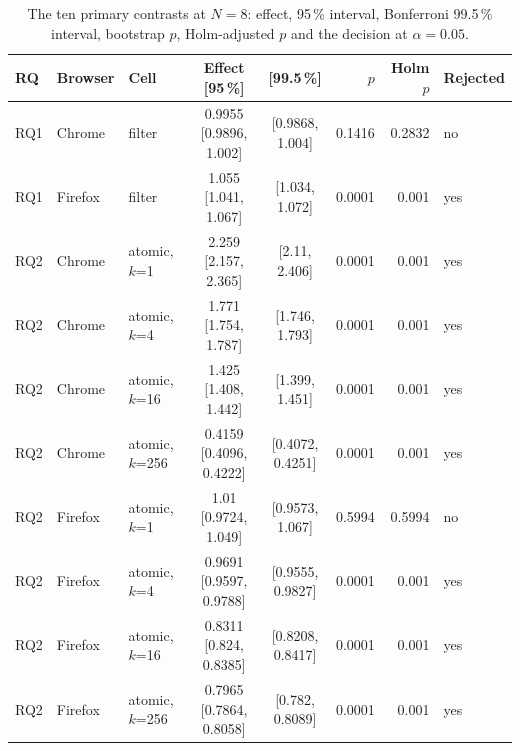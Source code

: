 \begin{table}[htbp]
\caption{The ten primary contrasts at $N=8$: effect, 95\,\% interval, Bonferroni 99.5\,\% interval, bootstrap $p$, Holm-adjusted $p$ and the decision at $\alpha=0.05$.}\label{tab:primary}
\centering\footnotesize
\begin{tabular}{lllccrrl}
\toprule
RQ & Browser & Cell & Effect [95\,\%] & [99.5\,\%] & $p$ & Holm $p$ & Rejected \\
\midrule
RQ1 & Chrome & filter & 0.9955 [0.9896, 1.002] & [0.9868, 1.004] & 0.1416 & 0.2832 & no \\
RQ1 & Firefox & filter & 1.055 [1.041, 1.067] & [1.034, 1.072] & 0.0001 & 0.001 & yes \\
RQ2 & Chrome & atomic, $k$=1 & 2.259 [2.157, 2.365] & [2.11, 2.406] & 0.0001 & 0.001 & yes \\
RQ2 & Chrome & atomic, $k$=4 & 1.771 [1.754, 1.787] & [1.746, 1.793] & 0.0001 & 0.001 & yes \\
RQ2 & Chrome & atomic, $k$=16 & 1.425 [1.408, 1.442] & [1.399, 1.451] & 0.0001 & 0.001 & yes \\
RQ2 & Chrome & atomic, $k$=256 & 0.4159 [0.4096, 0.4222] & [0.4072, 0.4251] & 0.0001 & 0.001 & yes \\
RQ2 & Firefox & atomic, $k$=1 & 1.01 [0.9724, 1.049] & [0.9573, 1.067] & 0.5994 & 0.5994 & no \\
RQ2 & Firefox & atomic, $k$=4 & 0.9691 [0.9597, 0.9788] & [0.9555, 0.9827] & 0.0001 & 0.001 & yes \\
RQ2 & Firefox & atomic, $k$=16 & 0.8311 [0.824, 0.8385] & [0.8208, 0.8417] & 0.0001 & 0.001 & yes \\
RQ2 & Firefox & atomic, $k$=256 & 0.7965 [0.7864, 0.8058] & [0.782, 0.8089] & 0.0001 & 0.001 & yes \\
\bottomrule
\end{tabular}
\end{table}
